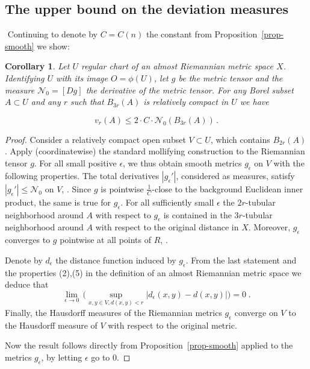 \documentclass[12pt,leqno]{amsart}
\numberwithin{equation}{section}
\newtheorem{cor}[thm]{Corollary}
\theoremstyle{definition}
\theoremstyle{remark}
\newcommand{\pref}[1]{Proposition~\ref{#1}}
\begin{document}










\subsection{The upper bound on the deviation  measures}
$  $
%
 Continuing to denote by $C=C(n)$ the constant from  Proposition~\ref{prop-smooth} we show:

\begin{cor} \label{cor-dc-vr}
Let $U$ regular chart of an almost Riemannian metric space $X$. Identifying $U$ with its image $O=\phi (U)$, let
$g$ be the metric tensor and the measure $\mathcal N_0 =[Dg]$ the  derivative of the metric tensor.  For any Borel subset $A\subset U$ and any $r$
such that $B_{3r} (A)$ is relatively compact in $U$ we have

\[
v_r (A) \leq 2 \cdot C \cdot  \mathcal N_0 (B_{3r} (A))\, .
\]
\end{cor}

\begin{proof}
Consider a relatively compact open subset $ V \subset U$, which contains $B_{2r} (A)$.  Apply (coordinatewise) the standard mollifying construction
to the Riemannian tensor $g$.  For all small positive $\epsilon$, we thus obtain  smooth metrics $g_{\epsilon}$ on $V$ with the following properties.
The total derivatives $|g_{\epsilon} '|$, considered as measures, satisfy  $|g_{\epsilon} '|\leq \mathcal N_0$ on $V$, \cite[Theorem 5.3.1]{Ziemer}.   Since $g$ is pointwise   $\frac 1 C$-close to the background Euclidean inner product, the same is true for  $g_{\epsilon}$.  For all sufficiently small $\epsilon$ the $2r$-tubular neighborhood around $A$ with respect to $g_{\epsilon}$ is contained in the $3r$-tubular neighborhood around $A$ with respect to the original distance in $X$. Moreover, $g_{\epsilon}$ converges to $g$ pointwise at all points of $R$, \cite[Theorem 1.6.1]{Ziemer}.

 Denote by $d_{\epsilon}$ the distance function induced by $g_{\epsilon}$.  From the last statement and the  properties (2),(5) in the definition of an almost Riemannian metric space we deduce that
\[
\lim _{\epsilon \to 0}\, \Big (\sup _{x,y \in V, d(x,y) <r} |d_{\epsilon} (x,y) -d(x,y)|\Big )=0 \; .
\]
 Finally, the Hausdorff measures of the Riemannian metrics $g_{\epsilon}$ converge on $V$ to the Hausdorff measure of $V$ with respect to the original metric.

 Now the result follows directly  from \pref{prop-smooth} applied to the metrics $g_{\epsilon}$, by letting $\epsilon$ go to $0$.
\end{proof}
\end{document}
